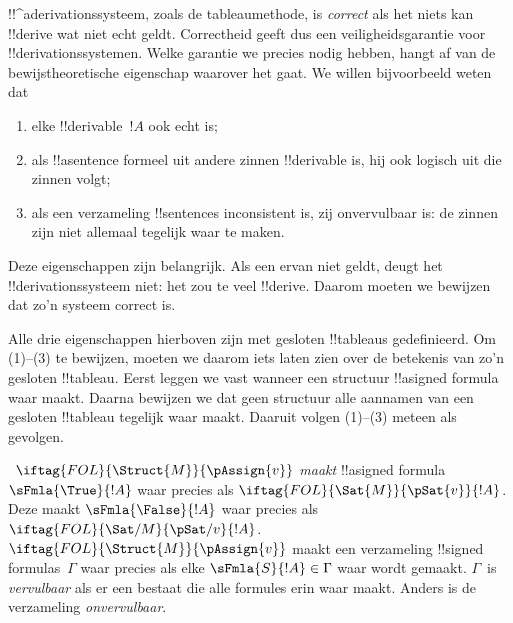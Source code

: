 \documentclass[../../../include/open-logic-section]{subfiles}
\begin{document}
      {}
      {}
      

\begin{explain}
!!^a{derivation}ssysteem, zoals de tableaumethode, is \emph{correct}
als het niets kan !!{derive} wat niet echt geldt. Correctheid geeft dus
een veiligheidsgarantie voor !!{derivation}ssystemen. Welke garantie
we precies nodig hebben, hangt af van de bewijstheoretische eigenschap
waarover het gaat. We willen bijvoorbeeld weten dat
\begin{enumerate}
\item elke !!{derivable}~$!A$ ook echt
   is;
\item als !!a{sentence} formeel uit andere zinnen !!{derivable} is, hij
  ook logisch uit die zinnen volgt;
\item als een verzameling !!{sentence}s inconsistent is, zij
  onvervulbaar is: de zinnen zijn niet allemaal tegelijk waar te maken.
\end{enumerate}
Deze eigenschappen zijn belangrijk. Als een ervan niet geldt, deugt
het !!{derivation}ssysteem niet: het zou te veel !!{derive}. Daarom
moeten we bewijzen dat zo'n systeem correct is.

Alle drie eigenschappen hierboven zijn met gesloten !!{tableau}s
gedefinieerd. Om (1)--(3) te bewijzen, moeten we daarom iets laten zien
over de betekenis van zo'n gesloten !!{tableau}. Eerst leggen we vast
wanneer een structuur !!a{signed formula} waar maakt. Daarna bewijzen
we dat geen structuur alle aannamen van een gesloten !!{tableau}
tegelijk waar maakt. Daaruit volgen (1)--(3) meteen als gevolgen.
\end{explain}

\begin{defn}
~$\iftag{FOL}{\Struct{M}}{\pAssign{v}}$
\emph{maakt} !!a{signed formula} $\sFmla{\True}{!A}$ waar
precies als $\iftag{FOL}{\Sat{M}}{\pSat{v}}{!A}$. Deze maakt
$\sFmla{\False}{!A}$ waar precies als
$\iftag{FOL}{\Sat/{M}}{\pSat/{v}}{!A}$. $\iftag{FOL}{\Struct{M}}{\pAssign{v}}$
maakt een verzameling !!{signed formula}s~$\Gamma$ waar precies als
elke $\sFmla{S}{!A} \in \Gamma$ waar wordt gemaakt. $\Gamma$~is
\emph{vervulbaar} als er een
 bestaat die alle formules
erin waar maakt. Anders is de verzameling \emph{onvervulbaar}.
\end{defn}
\end{document}
